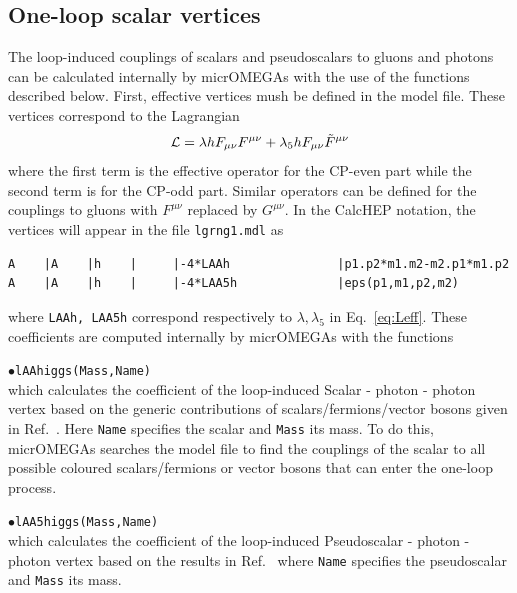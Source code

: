 \documentclass[12pt,a4paper]{article}
\begin{document}

\subsection{One-loop scalar vertices}

The loop-induced  couplings of scalars and pseudoscalars to  gluons and photons can be calculated internally by micrOMEGAs with the use of the functions described below. First, effective vertices mush be defined in the model file. These vertices  correspond to the Lagrangian 
\begin{equation}
{\cal L}= \lambda h F_{\mu\nu} F^{\mu\nu} +\lambda_5 h F_{\mu\nu} \tilde{F}^{\mu\nu}
\label{eq:Leff}
\end{equation}
where the first term is the effective operator for the CP-even part while the second term is for the CP-odd part. Similar operators can be defined for the couplings to gluons with $F^{\mu\nu}$ replaced by $G^{\mu\nu}$. In the CalcHEP notation, the vertices will appear in the file \verb|lgrng1.mdl| as

\begin{verbatim}
A    |A    |h    |     |-4*LAAh               |p1.p2*m1.m2-m2.p1*m1.p2
A    |A    |h    |     |-4*LAA5h              |eps(p1,m1,p2,m2)
\end{verbatim}
where \verb|LAAh, LAA5h| correspond respectively to $\lambda, \lambda_5$ in Eq.~\ref{eq:Leff}. These coefficients  are computed internally by micrOMEGAs with the functions

\noindent
$\bullet$\verb|lAAhiggs(Mass,Name)|\\
which calculates the coefficient of the loop-induced  Scalar - photon - photon  vertex based on the generic contributions  of scalars/fermions/vector bosons given  in Ref.~\cite{Djouadi:2005gi}. Here {\tt Name} specifies the  scalar and {\tt Mass} its mass. To do this, micrOMEGAs searches the model file to find the couplings of the scalar to all possible coloured scalars/fermions or vector bosons that can enter the one-loop process.

\noindent
$\bullet$\verb|lAA5higgs(Mass,Name)|\\
which calculates the coefficient of the loop-induced  Pseudoscalar - photon - photon   vertex based on the results in Ref.~\cite{Djouadi:2005gi} where {\tt Name} specifies the pseudoscalar and {\tt Mass} its mass. 
\end{document}
